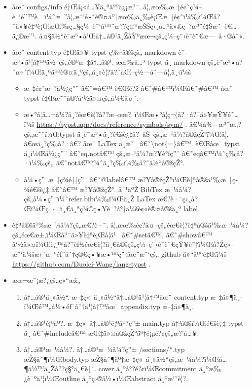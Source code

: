 \begin{itemize}
\item
  åœ¨ configs/info é‡Œå¡«å\ldots¥ä¸ªäººä¿¡æ?¯.
  å¦‚æœ‰æ~‡é¢˜ç¼--è¯`é''™è¯¯ï¼ˆæ¯''å¦‚æˆ`é»˜è®¤äº†æœ‰ä¸‰è¡Œæ~‡é¢˜ï¼‰ï¼Œå?¯ä»¥è‡ªè¡ŒæŒ‰ç\ldots§ç¼--è¯`å™¨æ??ç¤ºæŠŠç›¸å\ldots³ä»£ç~?æ³¨é‡Šæˆ--è€\ldots ä¿®æ''¹.
  å¤§ä½``è¯­æ³•å'Œå†\ldots å®¹ä¸ŽåŸºæœ¬çš„ç¼--ç¨‹è¯­è¨€æ---~å·®åˆ«.
\item
  åœ¨ content.typ é‡Œä»¥ typst ç‰¹å®šçš„ markdown
  è¯­æ³•ä¹¦å†™ä½~çš„è®ºæ--‡å†\ldots å®¹. æœ‰å\ldots³ typst ä¸­ markdown
  çš„è¯­æ³•å?˜æ›´ï¼Œä¸ªäººè®¤ä¸ºçš„ä¸»è¦?å?˜åŒ--ç½---åˆ---å¦‚ä¸‹ï¼š

  \begin{itemize}
  \tightlist
  \item
    æ~‡é¢˜æ~?ä½¿ç''¨ â€˜=â€™ è€Œé?ž â€˜\#â€™ï¼Œâ€˜\#â€™ åœ¨ typst
    é‡Œæ˜¯å®?å`½ä»¤çš„å¼€å¤´.
  \item
    æ•°å­¦å\ldots¬å¼?ä¸?éœ€è¦?å??æ--œæ?~ï¼Œæ•°å­¦ç¬¦å?·å?¯ä»¥æŸ¥é˜\ldots ï¼š
    \url{https://typst.app/docs/reference/symbols/sym/} .
    å€¼å¾---æ³¨æ„?çš„æ˜¯ï¼Œtypst
    ä¸­è¯­æ³•ä¸?é€šè¿‡å?~åŠ~çš„æ--¹å¼?å®žçŽ°ï¼Œå¦‚ â€œä¸?ç­‰å?·â€? åœ¨
    LaTex ä¸­æ˜¯ â€˜\textbackslash not\{=\}â€™. è€Œåœ¨ typst ä¸­ï¼Œä½¿ç''¨
    â€˜eq.notâ€™ çš„æ--¹å¼?æ?¥è°ƒç''¨ â€˜eqâ€™ï¼ˆç­‰å?·ï¼‰çš„
    â€˜notâ€™ï¼ˆä¸?ç­‰ï¼‰å?˜ä½``å®žçŽ°.
  \item
    å¼•ç''¨æ~‡ç­¾é‡‡ç''¨ â€˜@labelâ€™ æ?¥å®žçŽ°ï¼Œè‡ªå®šä¹‰æ~‡ç­¾é€šè¿‡
    â€˜â€™ æ?¥å®žçŽ°. å¯¹äºŽ BibTex
    æ~¼å¼?çš„å¼•ç''¨ï¼ˆrefer.bibï¼‰ï¼Œä¸Ž LaTex
    æ€?è·¯ç›¸å?Œï¼Œç¬¬ä¸€ä¸ªç¼©ç•¥è¯?å°†ä¼šè¢«è®¤å®šä¸º label.
  \end{itemize}
\item
  è‡ªå®šä¹‰æ~¼å¼?çš„æ€?è·¯.
  å¦‚æœ‰é¢?å¤--çš„éœ€è¦?è‡ªå®šä¹‰æ~¼å¼?çš„éœ€æ±‚ï¼Œå?¯ä»¥è‡ªè¡Œå­¦ä¹~
  â€˜\#setâ€™, â€˜\#showâ€™
  å`½ä»¤ï¼Œè¿™å?¯èƒ½éœ€è¦?ä¸€å®šçš„ç¼--ç¨‹è¯­è¨€çŸ¥è¯†ï¼Œå?Žç»­æˆ`ä¼šæ›´æ--°éƒ¨åˆ†ç®€ç•¥æ•™ç¨‹åœ¨æˆ`çš„
  github ä»``åº``é‡Œï¼š \url{https://github.com/Duolei-Wang/lang-typst}
  .
\item
  æœ¬æ¨¡æ?¿çš„ç»``æž„

  \begin{enumerate}
  \tightlist
  \item
    å†\ldots å®¹ä¸»ä½``. æ--‡ç«~ä¸»ä½``å†\ldots å®¹ä¹¦å†™åœ¨ content.typ
    æ--‡ä»¶ä¸­ï¼Œé™„å½•éƒ¨åˆ†ä¹¦å†™åœ¨ appendix.typ æ--‡ä»¶ä¸­.
  \item
    å†\ldots å®¹é¡ºåº?. æ--‡ç«~å†\ldots å®¹é¡ºåº?ç''± main.typ
    å†³å®šï¼Œé€šè¿‡ typst ä¸­ â€˜\#includeâ€™
    æŒ‡ä»¤å®žçŽ°äº†é¡µé?¢çš„æ?'å\ldots¥.
  \item
    å†\ldots å®¹æ~¼å¼?. å†\ldots å®¹æ~¼å¼?ç''± /sections/*.typ
    æŽ§åˆ¶ï¼Œbody.typ
    æŽ§åˆ¶äº†æ--‡ç«~ä¸»ä½``çš„æ~¼å¼?ï¼Œå\ldots¶ä½™ä¸Žå??ç§°ä¸€è‡´. cover
    ä¸ºå°?é?¢ï¼Œcommitment ä¸ºæ‰¿è¯ºä¹¦ï¼Œoutline ä¸ºç›®å½•ï¼Œabstract
    ä¸ºæ`˜è¦?.
  \end{enumerate}
\end{itemize}

